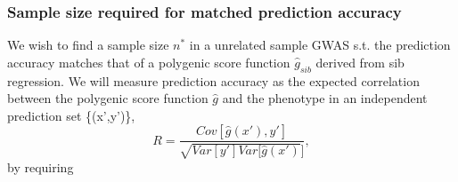 \documentclass[hidelinks, 12pt]{article}
\begin{document}
\subsubsection{Sample size required for matched prediction accuracy}

We wish to find a sample size $n^*$ in a unrelated sample GWAS s.t. the prediction accuracy matches that of a polygenic score function $\hat{g}_{sib}$ derived from sib regression.  We will measure prediction accuracy as the expected correlation between the polygenic score function $\hat{g}$ and the phenotype in an independent prediction set \{(x',y')\},
$$R = \frac{Cov[\hat{g}(x'),y']}{\sqrt{Var[y']Var[\hat{g}(x')}]},$$
by requiring 

\newcommand\reqeq{\mathrel{\stackrel{\makebox[0pt]{\mbox{\normalfont\tiny !}}}{=}}}
\end{document}
